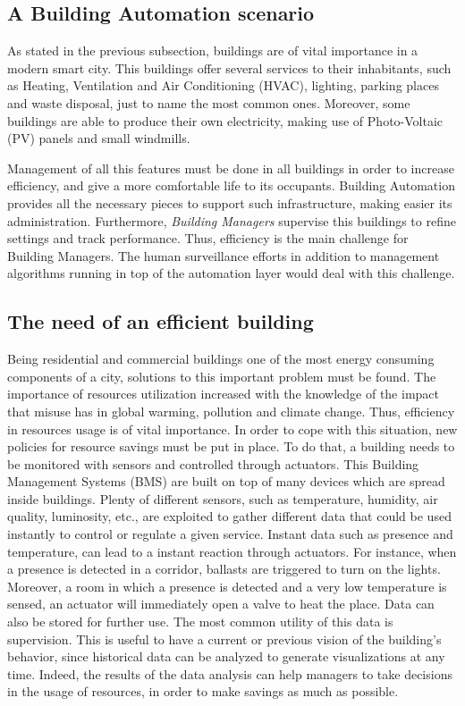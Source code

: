 \subsection{A Building Automation scenario}
\label{sec:BAScenario}
As stated in the previous subsection, buildings are of vital importance in a modern smart city.
This buildings offer several services to their inhabitants, such as Heating, Ventilation and Air Conditioning (HVAC), lighting, parking places and waste disposal, just to name the most common ones.
Moreover, some buildings are able to produce their own electricity, making use of Photo-Voltaic (PV) panels and small windmills.

Management of all this features must be done in all buildings in order to increase efficiency, and give a more comfortable life to its occupants.
Building Automation provides all the necessary pieces to support such infrastructure, making easier its administration.
Furthermore, \textit{Building Managers} supervise this buildings to refine settings and track performance.
Thus, efficiency is the main challenge for Building Managers.
The human surveillance efforts in addition to management algorithms running in top of the automation layer would deal with this challenge.

\subsection{The need of an efficient building}
\label{subsec:effBuilding}
Being residential and commercial buildings one of the most energy consuming components\cite{perezLombard2008energy} of a city, solutions to this important problem must be found.
The importance of resources utilization increased with the knowledge of the impact that misuse has in global warming, pollution and climate change.
Thus, efficiency in resources usage is of vital importance.
In order to cope with this situation, new policies for resource savings must be put in place.
To do that, a building needs to be monitored with sensors and controlled through actuators.
This Building Management Systems (BMS) are built on top of many devices which are spread inside buildings.
Plenty of different sensors, such as temperature, humidity, air quality, luminosity, etc., are exploited to gather different data that could be used instantly to control or regulate a given service.
Instant data such as presence and temperature, can lead to a instant reaction through actuators.
For instance, when a presence is detected in a corridor, ballasts are triggered to turn on the lights.
Moreover, a room in which a presence is detected and a very low temperature is sensed, an actuator will immediately open a valve to heat the place.
Data can also be stored for further use.
The most common utility of this data is supervision.
This is useful to have a current or previous vision of the building's behavior, since historical data can be analyzed to generate visualizations at any time.
Indeed, the results of the data analysis can help managers to take decisions in the usage of resources, in order to make savings as much as possible.

